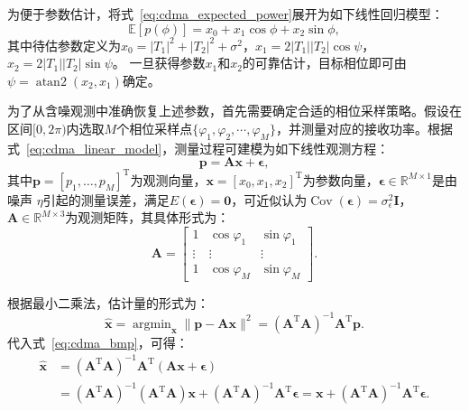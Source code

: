 为便于参数估计，将式~\eqref{eq:cdma_expected_power}展开为如下线性回归模型：
\begin{equation}\label{eq:cdma_linear_model}
	\mathbb{E}[p(\phi)] = x_0 + x_1 \cos\phi + x_2 \sin\phi,
\end{equation}
其中待估参数定义为$x_0 = |T_1|^2 + |T_2|^2 + \sigma^2$，$x_1 = 2|T_1||T_2| \cos\psi$，$x_2 = 2|T_1||T_2| \sin\psi$。
一旦获得参数$x_1$和$x_2$的可靠估计，目标相位即可由$\psi = \operatorname{atan2}(x_2, x_1)$确定。

为了从含噪观测中准确恢复上述参数，首先需要确定合适的相位采样策略。假设在区间$[0, 2\pi)$内选取$M$个相位采样点$\{\varphi_1, \varphi_2, \cdots, \varphi_M\}$，并测量对应的接收功率。根据式~\eqref{eq:cdma_linear_model}，测量过程可建模为如下线性观测方程：
\begin{equation}\label{eq:cdma_bmp}
	\bm{p} = \bm{A} \bm{x} + \bm{\epsilon},
\end{equation}
其中$\bm p=[p_1,\ldots,p_M]^\mathrm{T}$为观测向量，$\bm x=[x_0,x_1,x_2]^\mathrm{T}$为参数向量，$\bm\epsilon\in\mathbb{R}^{M\times 1}$是由噪声 $\eta$引起的测量误差，满足$E(\boldsymbol{\epsilon}) = \mathbf{0}$，可近似认为$\operatorname{Cov}(\boldsymbol{\epsilon})=\sigma_\epsilon^2\bm I$，$\bm A\in\mathbb{R}^{M\times 3}$为观测矩阵，其具体形式为：
\begin{equation}
	\bm A=
	\begin{bmatrix}
		1      & \cos\varphi_1 & \sin\varphi_1 \\
		\vdots & \vdots        & \vdots        \\
		1      & \cos\varphi_M & \sin\varphi_M
	\end{bmatrix}.
\end{equation}

根据最小二乘法，估计量的形式为：
\begin{equation}
	\hat{\bm{x}}
	= \mathop{\arg\min}_{\bm x} \|\bm{p} - \bm{A}{\bm{x}}\|^2
	= (\bm{A}^\mathrm{T} \bm{A})^{-1} \bm{A}^\mathrm{T} \bm{p}.
\end{equation}
代入式~\eqref{eq:cdma_bmp}，可得：
\begin{align}
	\hat{\bm{x}} 
	&= (\bm{A}^{\mathrm{T}} \bm{A})^{-1} \bm{A}^{\mathrm{T}} (\bm{A} \bm{x} + \bm{\epsilon}) \\
	&= (\bm{A}^{\mathrm{T}} \bm{A})^{-1} (\bm{A}^{\mathrm{T}} \bm{A}) \bm{x}
	+ (\bm{A}^{\mathrm{T}} \bm{A})^{-1} \bm{A}^{\mathrm{T}} \bm{\epsilon} = \bm{x} + (\bm{A}^{\mathrm{T}} \bm{A})^{-1} \bm{A}^{\mathrm{T}} \bm{\epsilon}.
\end{align}


